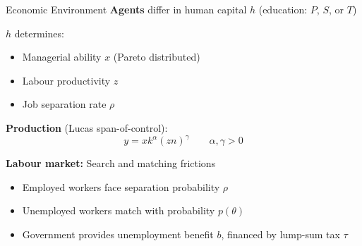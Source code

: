 \documentclass[aspectratio=169, 11pt]{beamer}
\begin{document}
\begin{frame}{Economic Environment}
    \textbf{Agents} differ in human capital $h$ (education: $P$, $S$, or $T$)

    \vspace{0.5em}

    $h$ determines:
    \begin{itemize}
        \item Managerial ability $x$ \quad (Pareto distributed)
        \item Labour productivity $z$
        \item Job separation rate $\rho$
    \end{itemize}

    \vspace{0.8em}

    \textbf{Production} \quad (Lucas span-of-control):
    \[
        y = x k^{\alpha}(zn)^{\gamma} \qquad \alpha, \gamma > 0
    \]

    \vspace{0.5em}

    \textbf{Labour market:} Search and matching frictions
    \begin{itemize}
        \item Employed workers face separation probability $\rho$
        \item Unemployed workers match with probability $p(\theta)$
        \item Government provides unemployment benefit $b$, financed by lump-sum tax $\tau$
    \end{itemize}
\end{frame}

\end{document}
